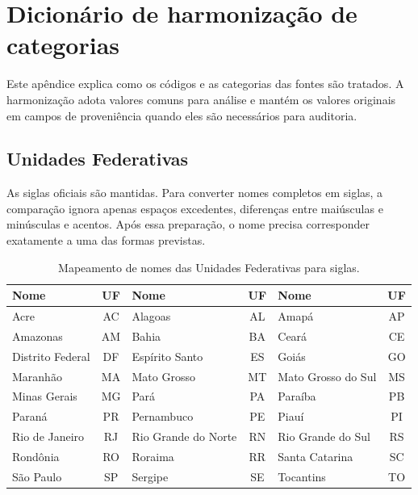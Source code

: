 \chapter{Dicionário de harmonização de categorias}
\label{ap:harmonizacao}
\setlength{\tabcolsep}{2pt}
\setlength{\emergencystretch}{3em}

Este apêndice explica como os códigos e as categorias das fontes são tratados. A harmonização adota valores comuns para análise e mantém os valores originais em campos de proveniência quando eles são necessários para auditoria.

\section{Unidades Federativas}

As siglas oficiais são mantidas. Para converter nomes completos em siglas, a comparação ignora apenas espaços excedentes, diferenças entre maiúsculas e minúsculas e acentos. Após essa preparação, o nome precisa corresponder exatamente a uma das formas previstas.

\begin{table}[H]
\centering
\scriptsize
\caption{Mapeamento de nomes das Unidades Federativas para siglas.}
\label{tab:ap-ufs}
\renewcommand{\arraystretch}{1.1}
\begin{tabular}{|p{3.3cm}|c|p{3.3cm}|c|p{3.3cm}|c|}
\hline
\textbf{Nome} & \textbf{UF} & \textbf{Nome} & \textbf{UF} & \textbf{Nome} & \textbf{UF} \\ \hline
Acre & AC & Alagoas & AL & Amapá & AP \\ \hline
Amazonas & AM & Bahia & BA & Ceará & CE \\ \hline
Distrito Federal & DF & Espírito Santo & ES & Goiás & GO \\ \hline
Maranhão & MA & Mato Grosso & MT & Mato Grosso do Sul & MS \\ \hline
Minas Gerais & MG & Pará & PA & Paraíba & PB \\ \hline
Paraná & PR & Pernambuco & PE & Piauí & PI \\ \hline
Rio de Janeiro & RJ & Rio Grande do Norte & RN & Rio Grande do Sul & RS \\ \hline
Rondônia & RO & Roraima & RR & Santa Catarina & SC \\ \hline
São Paulo & SP & Sergipe & SE & Tocantins & TO \\ \hline
\end{tabular}
\end{table}

